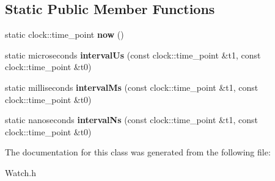 \subsection*{Static Public Member Functions}
\begin{DoxyCompactItemize}
\item 
\hypertarget{class_course_1_1_watch_af2418f8dc3b14a4fc85df152ce18d8e5}{static clock\-::time\-\_\-point {\bfseries now} ()}\label{class_course_1_1_watch_af2418f8dc3b14a4fc85df152ce18d8e5}

\item 
\hypertarget{class_course_1_1_watch_a8a005262c7569ba836b0013aae055300}{static microseconds {\bfseries interval\-Us} (const clock\-::time\-\_\-point \&t1, const clock\-::time\-\_\-point \&t0)}\label{class_course_1_1_watch_a8a005262c7569ba836b0013aae055300}

\item 
\hypertarget{class_course_1_1_watch_a9e03f58e2a0e199b3368b54e82f50580}{static milliseconds {\bfseries interval\-Ms} (const clock\-::time\-\_\-point \&t1, const clock\-::time\-\_\-point \&t0)}\label{class_course_1_1_watch_a9e03f58e2a0e199b3368b54e82f50580}

\item 
\hypertarget{class_course_1_1_watch_a25a03acd69f353ada818dd839b6c9d13}{static nanoseconds {\bfseries interval\-Ns} (const clock\-::time\-\_\-point \&t1, const clock\-::time\-\_\-point \&t0)}\label{class_course_1_1_watch_a25a03acd69f353ada818dd839b6c9d13}

\end{DoxyCompactItemize}


The documentation for this class was generated from the following file\-:\begin{DoxyCompactItemize}
\item 
Watch.\-h\end{DoxyCompactItemize}
